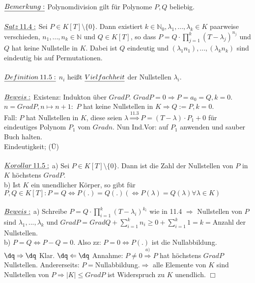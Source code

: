 \documentclass[fleqn, a4paper, 11pt]{article}
\begin{document}
\\
$\uline{Bemerkung:}$ Polynomdivision gilt f\"ur Polynome $P,Q$ beliebig.\\
\\
$\uline{Satz\:11.4:}$ Sei $P\in K[T]\setminus\{0\}$. Dann existiert $k\in\mathbb{N}_0,\lambda_1,...,\lambda_k\in K$ paarweise verschieden, $n_1,...,n_k\in\mathbb{N}$ und $Q\in K[T]$, so dass $P=Q\cdot\prod_{j=1}^k (T-\lambda_j)^{n_j}$ und $Q$ hat keine Nullstelle in $K$. Dabei ist $Q$ eindeutig und $(\lambda_1 n_1),...,(\lambda_k n_k)$ sind eindeutig bis auf Permutationen.\\
\\
$\uline{Definition\:11.5:}$ $n_i$ hei\ss{}t $\uline{Vielfachheit}$ der Nullstellen $\lambda_i$.\\
\\
$\uline{Beweis:}$ Existenz: Indukton \"uber $Grad P$. $Grad P=0\Rightarrow P=a_0=Q,k=0$. $n=Grad P,n\mapsto n+1:$ $P$ hat keine Nullstellen in $K\Rightarrow Q:=P,k=0$.\\
Fall: $P$ hat Nullstellen in $K$, diese seien $\lambda\stackrel{11.3}{\Rightarrow}P=(T-\lambda)\cdot P_1 +0$ f\"ur eindeutiges Polynom $P_1$ vom $Grad n$. Nun Ind.Vor: auf $P_1$ anwenden und sauber \dq Buch halten\dq.\\
Eindeutigkeit; (\"U)\\
\\
$\uline{Korollar\:11.5:}$ a) Sei $P\in K[T]\setminus\{0\}$. Dann ist die Zahl der Nullstellen von $P$ in $K$ h\"ochstens $Grad P$.\\
b) Ist $K$ ein unendlicher K\"orper, so gibt f\"ur $P,Q\in K[T]:P=Q\Leftrightarrow P(.)=Q(.)(\Leftrightarrow P(\lambda)=Q(\lambda) \forall\lambda\in K)$\\
\\
$\uline{Beweis:}$ a) Schreibe $P=Q\cdot\prod_{i=1}^k (T-\lambda_i)^{k_i}$ wie in 11.4 $\Rightarrow$ Nullstellen von $P$ sind $\lambda_1,...,\lambda_k$ und $Grad P=Grad Q+\sum\limits_{i=1}^k n_i\geq 0+\sum\limits_{i=1}^k 1=k=$Anzahl der Nullstellen.\\
b) $P=Q\Leftrightarrow P-Q=0$. Also zz: $P=0\Leftrightarrow P(.)$ ist die Nullabbildung.\\
$\dq\Rightarrow\dq$ Klar. $\dq\Leftarrow\dq$ Annahme: $P\neq 0\stackrel{a)}{\Rightarrow} P$ hat h\"ochstens $Grad P$ Nullstellen. Andererseits: $P=$Nullabbildung.$\Rightarrow$ alle Elemente von $K$ sind Nullstellen von $P\Rightarrow |K|\leq Grad P$ ist Widerspruch zu $K$ unendlich. \hfill $\Box$\\
\\
\end{document}
